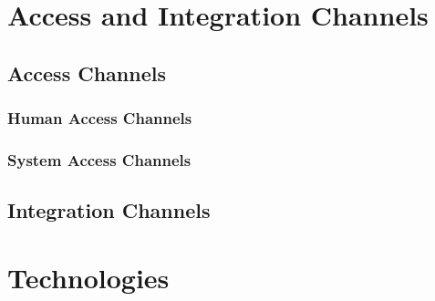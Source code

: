 \documentclass[a4paper,12pt,titlepage]{article}
\begin{document}
\section{Access and Integration Channels}
\subsection{Access Channels}
\subsubsection{Human Access Channels}%
\subsubsection{System Access Channels}%
	
\subsection{Integration Channels}%
	
\newpage
\section{Technologies}%

\end{document}
